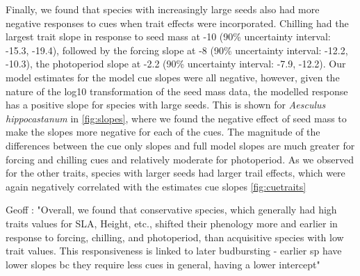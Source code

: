 \documentclass{article}\usepackage[]{graphicx}\usepackage[]{color}
\begin{document}
Finally, we found that species with increasingly large seeds also had more negative responses to cues when trait effects were incorporated. Chilling had the largest trait slope in response to seed mass at -10 (90\% uncertainty interval: -15.3, -19.4), followed by the forcing slope at -8 (90\% uncertainty interval: -12.2, -10.3), the photoperiod slope at -2.2 (90\% uncertainty interval: -7.9, -12.2). Our model estimates for the model cue slopes were all negative, however, given the nature of the log10 transformation of the seed mass data, the modelled response has a positive slope for species with large seeds. This is shown for \textit{Aesculus hippocastanum} in \ref{fig:slopes}, where we found the negative effect of seed mass to make the slopes more negative for each of the cues. The magnitude of the differences between the cue only slopes and full model slopes are much greater for forcing and chilling cues and relatively moderate for photoperiod. As we observed for the other traits, species with larger seeds had larger trail effects, which were again negatively correlated with the estimates cue slopes \ref{fig:cuetraits}

Geoff : "Overall, we found that conservative species, which generally had high traits values for SLA, Height, etc., shifted their phenology more and earlier in response to forcing, chilling, and photoperiod, than acquisitive species with low trait values. This responsiveness is linked to later budbursting - earlier sp have lower slopes bc they require less cues in general, having a lower intercept"
\end{document}
